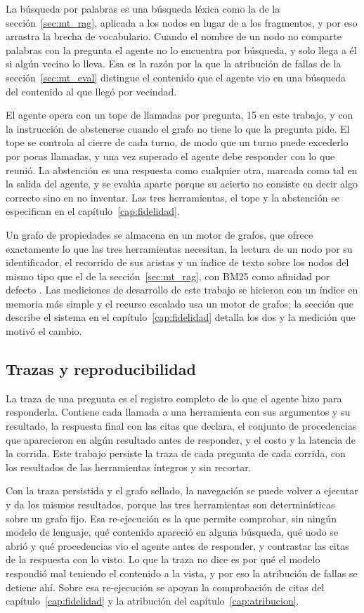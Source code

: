 \documentclass[12pt,a4paper]{report}
\begin{document}
La búsqueda por palabras es una búsqueda léxica como la de la sección~\ref{sec:mt_rag}, aplicada a los nodos en lugar de a los fragmentos, y por eso arrastra la brecha de vocabulario. Cuando el nombre de un nodo no comparte palabras con la pregunta el agente no lo encuentra por búsqueda, y solo llega a él si algún vecino lo lleva. Esa es la razón por la que la atribución de fallas de la sección~\ref{sec:mt_eval} distingue el contenido que el agente vio en una búsqueda del contenido al que llegó por vecindad.

El agente opera con un tope de llamadas por pregunta, 15 en este trabajo, y con la instrucción de abstenerse cuando el grafo no tiene lo que la pregunta pide. El tope se controla al cierre de cada turno, de modo que un turno puede excederlo por pocas llamadas, y una vez superado el agente debe responder con lo que reunió. La abstención es una respuesta como cualquier otra, marcada como tal en la salida del agente, y se evalúa aparte porque su acierto no consiste en decir algo correcto sino en no inventar. Las tres herramientas, el tope y la abstención se especifican en el capítulo~\ref{cap:fidelidad}.

Un grafo de propiedades se almacena en un motor de grafos, que ofrece exactamente lo que las tres herramientas necesitan, la lectura de un nodo por su identificador, el recorrido de sus aristas y un índice de texto sobre los nodos del mismo tipo que el de la sección~\ref{sec:mt_rag}, con BM25 como afinidad por defecto \cite{robertson2009bm25}. Las mediciones de desarrollo de este trabajo se hicieron con un índice en memoria más simple y el recurso escalado usa un motor de grafos; la sección que describe el sistema en el capítulo~\ref{cap:fidelidad} detalla los dos y la medición que motivó el cambio.

\subsection{Trazas y reproducibilidad}

La traza de una pregunta es el registro completo de lo que el agente hizo para responderla. Contiene cada llamada a una herramienta con sus argumentos y su resultado, la respuesta final con las citas que declara, el conjunto de procedencias que aparecieron en algún resultado antes de responder, y el costo y la latencia de la corrida. Este trabajo persiste la traza de cada pregunta de cada corrida, con los resultados de las herramientas íntegros y sin recortar.

Con la traza persistida y el grafo sellado, la navegación se puede volver a ejecutar y da los mismos resultados, porque las tres herramientas son determinísticas sobre un grafo fijo. Esa re-ejecución es la que permite comprobar, sin ningún modelo de lenguaje, qué contenido apareció en alguna búsqueda, qué nodo se abrió y qué procedencias vio el agente antes de responder, y contrastar las citas de la respuesta con lo visto. Lo que la traza no dice es por qué el modelo respondió mal teniendo el contenido a la vista, y por eso la atribución de fallas se detiene ahí. Sobre esa re-ejecución se apoyan la comprobación de citas del capítulo~\ref{cap:fidelidad} y la atribución del capítulo~\ref{cap:atribucion}.
\end{document}
